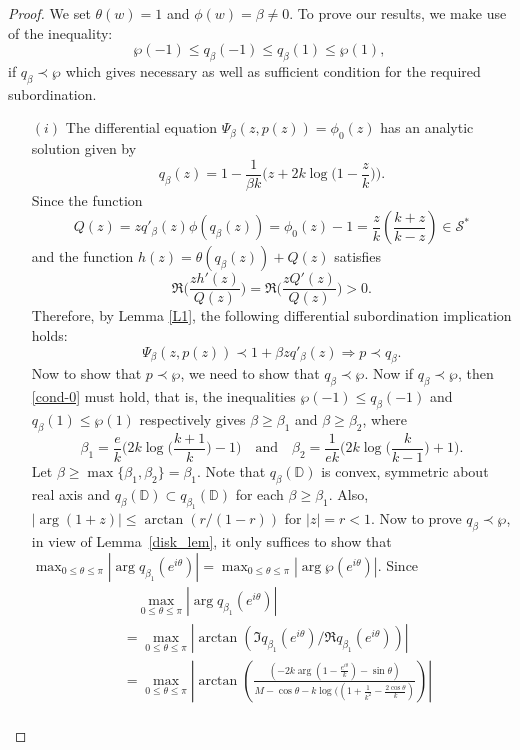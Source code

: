 \documentclass[12pt, reqno]{amsart}
\numberwithin{equation}{section}
\theoremstyle{plain}
\theoremstyle{definition}
\theoremstyle{remark}
\begin{document}
\begin{proof}
	We set $\theta(w)=1$ and $\phi(w)=\beta\neq0$. To prove our results, we make use of the inequality: 
	\begin{equation}\label{cond-0}
	\wp(-1)\leq q_{\beta}(-1)\leq q_{\beta}(1)\leq \wp(1),
	\end{equation} 
	if $q_{\beta}\prec \wp$ which gives necessary as well as sufficient condition for the required subordination.
	\begin{itemize}
		\item [$(i)$] The differential equation $\Psi_\beta(z, p(z))=\phi_0(z)$ has an analytic solution given by
		\begin{equation*}
		q_{\beta}(z)=1-\frac{1}{\beta k}\biggl(z+2k\log\biggl(1-\frac{z}{k}\biggl)\biggl).
		\end{equation*}
		Since the function 
		$$Q(z)=zq'_{\beta}(z)\phi(q_{\beta}(z))=\phi_0(z)-1=\frac{z}{k}\left(\frac{k+z}{k-z}\right)\in\mathcal{S}^{*}$$ and the function	$h(z)=\theta(q_{\beta}(z))+Q(z)$ satisfies  
		$$\Re\biggl(\frac{zh'(z)}{Q(z)}\biggl)=\Re\biggl(\frac{zQ'(z)}{Q(z)}\biggl)>0.$$ 
		Therefore, by Lemma \ref{L1}, the following differential subordination implication holds:
		$$\Psi_\beta(z, p(z))\prec 1+\beta zq'_{\beta}(z)\Rightarrow p\prec q_{\beta}.$$
		Now to show that $p\prec \wp$, we need to show that $q_{\beta}\prec\wp$. Now if $q_{\beta}\prec\wp$, then \eqref{cond-0} must hold, that is, the inequalities $\wp(-1)\leq q_{\beta}(-1)$ and $q_{\beta}(1)\leq\wp(1)$ respectively gives $\beta\geq\beta_1$ and $\beta\geq\beta_2$, where
		$$\beta_1=\frac{e}{k}\biggl(2k\log\biggl(\frac{k+1}{k}\biggl)-1\biggl) \quad\text{and}\quad \beta_2=\frac{1}{ek}\biggl(2k\log\biggl(\frac{k}{k-1}\biggl)+1\biggl).$$
		Let $\beta\geq\max\{\beta_1,\beta_2\}=\beta_1$. Note that $q_{\beta}(\mathbb{D})$ is convex, symmetric about real axis and  $q_{\beta}(\mathbb{D})\subset q_{\beta_{1}}(\mathbb{D})$ for each $\beta\geq{\beta_1}$. Also, $|\arg(1+z)|\leq\arctan(r/(1-r))$ for $|z|=r<1$. Now to prove $q_{\beta}\prec\wp$, in view of Lemma~\ref{disk_lem}, it only suffices to show that 
		$\max_{0\leq\theta\leq\pi}|\arg{q_{\beta_1}(e^{i\theta})}|=\max_{0\leq\theta\leq\pi}\left|\arg{\wp(e^{i\theta})}\right|$. Since    
		\begin{align*}
		&\quad \max_{0\leq\theta\leq\pi}|\arg{q_{\beta_1}(e^{i\theta})}|\\
		&=\max_{0\leq\theta\leq\pi}\left|\arctan({\Im{q_{\beta_1}(e^{i\theta})}}/{\Re{q_{\beta_1}(e^{i\theta})}})\right|\\
		&=\max_{0\leq\theta\leq\pi}\left|\arctan\left(\frac{(-2k\arg\left(1-\frac{e^{i\theta}}{k}\right)-\sin\theta)}{M-\cos\theta-{k\log((1+\frac{1}{k^2}-\frac{2\cos\theta}{k})}}\right)\right|\\

\end{align*}
\end{itemize}
\end{proof}
\end{document}
